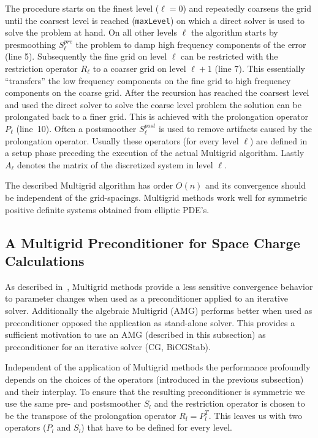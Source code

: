 The procedure starts on the finest level ($\ell\!=\!0$) and repeatedly
coarsens the grid until the coarsest level is reached
(\texttt{maxLevel}) on which a direct solver is used to solve the
problem at hand.  On all other levels $\ell$ the algorithm starts by
presmoothing $S_\ell^{pre}$ the problem to damp high frequency
components of the error (line 5).  Subsequently the fine grid on level
$\ell$ can be restricted with the restriction operator $R_\ell$ to a
coarser grid on level $\ell+ 1$ (line $7$).  This essentially
``transfers'' the low frequency components on the fine grid to high
frequency components on the coarse grid.  After the recursion has
reached the coarsest level and used the direct solver to solve the
coarse level problem the solution can be prolongated back to a finer
grid.  This is achieved with the prolongation operator $P_\ell$
(line~10).  Often a postsmoother $S_\ell^{post}$ is used to remove
artifacts caused by the prolongation operator.  Usually these operators
(for every level $\ell$) are defined in a setup phase preceding the
execution of the actual Multigrid algorithm.  Lastly $A_\ell$ denotes
the matrix of the discretized system in level $\ell$.

The described Multigrid algorithm has order $O(n)$ and its convergence
should be independent of the grid-spacings.  Multigrid methods work well
for symmetric positive definite systems obtained from elliptic PDE's.

\subsection{A Multigrid Preconditioner for Space Charge
  Calculations} \label{sec:mgprec}

As described in~\cite{oowa:98}, Multigrid methods provide a less
sensitive convergence behavior to parameter changes when used as a
preconditioner applied to an iterative solver.  Additionally the
algebraic Multigrid (AMG) performs better when used as preconditioner
opposed the application as stand-alone solver.  This provides a
sufficient motivation to use an AMG (described in this subsection) as
preconditioner for an iterative solver (CG, BiCGStab).

Independent of the application of Multigrid methods the performance
profoundly depends on the choices of the operators (introduced in the
previous subsection) and their interplay.  To ensure that the resulting
preconditioner is symmetric we use the same pre- and postsmoother $S_l$
and the restriction operator is chosen to be the transpose of the
prolongation operator $R_l = P_l^T$.  This leaves us with two operators
($P_l$ and $S_l$) that have to be defined for every level.

